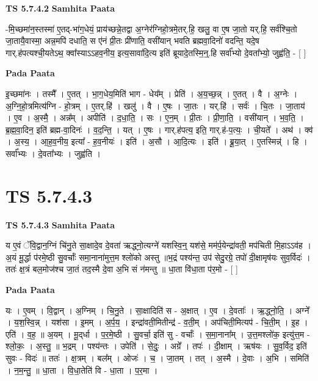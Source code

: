 \documentclass[17pt]{extarticle}
\begin{document}
\textbf{TS 5.7.4.2 } \newline
\textbf{Samhita Paata} \newline

-मि॒च्छमा॑न॒स्तस्मा॑ ए॒तद्-भा॑ग॒धेयं॒ प्राय॑च्छन्ने॒तद्वा अ॒ग्नेर॑ग्निहो॒त्रमे॒तर्.हि॒ खलु॒ वा ए॒ष जा॒तो यर्.हि॒ सर्व॑श्चि॒तो जा॒तायै॒वास्मा॒ अन्न॒मपि॑ दधाति॒ स ए॑नं प्री॒तः प्री॑णाति॒ वसी॑यान् भवति ब्रह्मवा॒दिनो॑ वदन्ति॒ यदे॒ष गार्.ह॑पत्यश्ची॒यतेऽथ॒ क्वा᳚स्याऽऽहव॒नीय॒ इत्य॒सावा॑दि॒त्य इति॑ ब्रूयादे॒तस्मि॒न्॒.हि सर्वा᳚भ्यो दे॒वता᳚भ्यो॒ जुह्व॑ति॒ - [  ] \newline

\textbf{Pada Paata} \newline

इ॒च्छमा॑नः । तस्मै᳚ । ए॒तत् । भा॒ग॒धेय॒मिति॑ भाग - धेय᳚म् । प्रेति॑ । अ॒य॒च्छ॒न्न् । ए॒तत् । वै । अ॒ग्नेः । अ॒ग्नि॒हो॒त्रमित्य॑ग्नि - हो॒त्रम् । ए॒तर्.हि॑ । खलु॑ । वै । ए॒षः । जा॒तः । यर्.हि॑ । सर्वः॑ । चि॒तः । जा॒ताय॑ । ए॒व । अ॒स्मै॒ । अन्न᳚म् । अपीति॑ । द॒धा॒ति॒ । सः । ए॒न॒म् । प्री॒तः । प्री॒णा॒ति॒ । वसी॑यान् । भ॒व॒ति॒ । ब्र॒ह्म॒वा॒दिन॒ इति॑ ब्रह्म-वा॒दिनः॑ । व॒द॒न्ति॒ । यत् । ए॒षः । गार्.ह॑पत्य॒ इति॒ गार्.ह॑-प॒त्यः॒ । ची॒यते᳚ । अथ॑ । क्व॑ । अ॒स्य॒ । आ॒ह॒व॒नीय॒ इत्या᳚ -   ह॒व॒नीयः॑ । इति॑ । अ॒सौ । आ॒दि॒त्यः । इति॑ । ब्रू॒या॒त् । ए॒तस्मिन्न्॑ । हि । सर्वा᳚भ्यः । दे॒वता᳚भ्यः । जुह्व॑ति ।  \newline




\section*{ TS 5.7.4.3 }

\textbf{TS 5.7.4.3 } \newline
\textbf{Samhita Paata} \newline

य ए॒वं ॅवि॒द्वान॒ग्निं चि॑नु॒ते सा॒क्षादे॒व दे॒वता॑ ऋद्ध्नो॒त्यग्ने॑ यशस्वि॒न्॒ यश॑से॒ मम॑र्प॒येन्द्रा॑वती॒ मप॑चिती मि॒हाऽऽव॑ह । अ॒यं मू॒र्द्धा प॑रमे॒ष्ठी सु॒वर्चाः᳚ समा॒नाना॑मुत्त॒म श्लो॑को अस्तु ॥भ॒द्रं पश्य॑न्त॒ उप॑ सेदु॒रग्रे॒ तपो॑ दी॒क्षामृष॑यः सुव॒र्विदः॑ । ततः॑ क्ष॒त्रं बल॒मोज॑श्च जा॒तं तद॒स्मै दे॒वा अ॒भि सं न॑मन्तु ॥ धा॒ता वि॑धा॒ता प॑र॒मो - [  ] \newline

\textbf{Pada Paata} \newline

यः । ए॒वम् । वि॒द्वान् । अ॒ग्निम् । चि॒नु॒ते । सा॒क्षादिति॑ स - अ॒क्षात् । ए॒व । दे॒वताः᳚ । ऋ॒द्ध्नो॒ति॒ । अग्ने᳚ । य॒श॒स्वि॒न्न् । यश॑सा । इ॒मम् । अ॒र्प॒य॒ । इन्द्रा॑वती॒मितीन्द्र॑ - व॒ती॒म् । अप॑चिती॒मित्यप॑ - चि॒ती॒म् । इ॒ह । एति॑ । व॒ह॒ ॥ अ॒यम् । मू॒द्‌र्धा । प॒र॒मे॒ष्ठी । सु॒वर्चा॒ इति॑ सु - वर्चाः᳚ । स॒मा॒नाना᳚म् । उ॒त्त॒मश्लो॑क॒ इत्यु॑त्त॒म - श्लो॒कः॒ । अ॒स्तु॒ ॥ भ॒द्रम् । पश्य॑न्तः । उपेति॑ । से॒दुः॒ । अग्रे᳚ । तपः॑ । दी॒क्षाम् । ऋष॑यः । सु॒व॒र्विद॒ इति॑ सुवः - विदः॑ ॥ ततः॑ । क्ष॒त्रम् । बल᳚म् । ओजः॑ । च॒ । जा॒तम् । तत् । अ॒स्मै । दे॒वाः । अ॒भि । समिति॑ । न॒म॒न्तु॒ ॥ धा॒ता । वि॒धा॒तेति॑ वि - धा॒ता । प॒र॒मा ।  \newline
\end{document}
